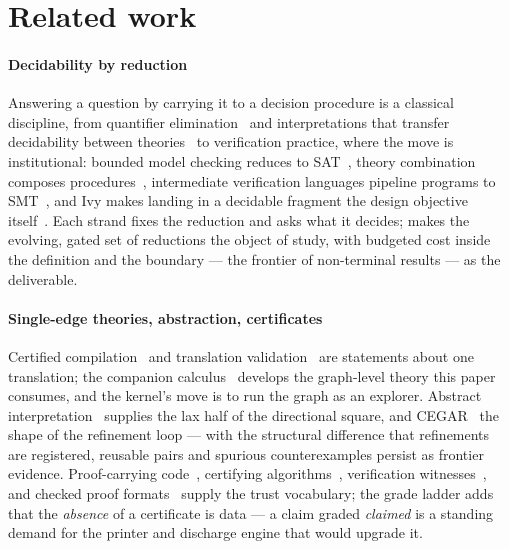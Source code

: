 
\section{Related work}
\label{sec:related}

\paragraph{Decidability by reduction}
Answering a question by carrying it to a decision procedure is a
classical discipline, from quantifier
elimination~\citep{presburger1929,tarski1951decision} and
interpretations that transfer decidability between
theories~\citep{tarski1953undecidable,rabin1969trees} to
verification practice, where the move is institutional: bounded
model checking reduces to SAT~\citep{biere1999bmc}, theory
combination composes procedures~\citep{nelson1979simplification},
intermediate verification languages pipeline programs to
SMT~\citep{barnett2005boogie,filliatre2013why3}, and Ivy makes
landing in a decidable fragment the design objective
itself~\citep{padon2016ivy,padon2017epr}. Each strand fixes the
reduction and asks what it decides; \hg{} makes the evolving, gated
set of reductions the object of study, with budgeted cost inside
the definition and the boundary --- the frontier of non-terminal
results --- as the deliverable.

\paragraph{Single-edge theories, abstraction, certificates}
Certified compilation~\citep{leroy2009compcert,kumar2014cakeml} and
translation
validation~\citep{pnueli1998tv,necula2000tv,lopes2021alive2} are
statements about one translation; the companion
calculus~\citep{hurdygurdy2026calculus} develops the graph-level
theory this paper consumes, and the kernel's move is to run the
graph as an explorer. Abstract
interpretation~\citep{cousot1977abstract} supplies the lax half of
the directional square, and CEGAR~\citep{clarke2000cegar} the shape
of the refinement loop --- with the structural difference that
refinements are registered, reusable pairs and spurious
counterexamples persist as frontier evidence. Proof-carrying
code~\citep{necula1997pcc}, certifying
algorithms~\citep{mcconnell2011certifying}, verification
witnesses~\citep{beyer2015witnesses}, and checked proof
formats~\citep{wetzler2014drat,tan2021cakelpr} supply the trust
vocabulary; the grade ladder adds that the \emph{absence} of a
certificate is data --- a claim graded \emph{claimed} is a standing
demand for the printer and discharge engine that would upgrade it.

